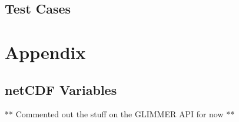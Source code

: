 \chapter{Test Cases}
\label{sec:testcases}
\renewcommand{\dir}{tests}



%

%


%

%

%

\part{Appendix}
\appendix
\renewcommand{\dir}{ug}
\chapter{netCDF Variables}

** Commented out the stuff on the GLIMMER API for now **
%
%
%
\renewcommand{\dir}{ext}


